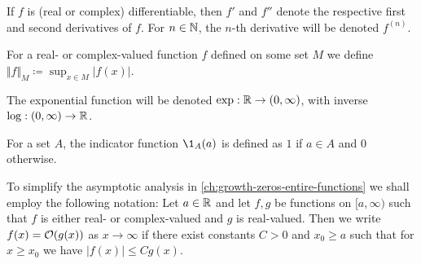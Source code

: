 If $f$ is (real or complex) differentiable, then $f'$ and $f''$ denote the respective first and second derivatives of $f$. For $n \in \mathbb{N}$, the $n$-th derivative will be denoted $f^{(n)}$.

For a real- or complex-valued function $f$ defined on some set $M$ we define $\Vert f \Vert_M \coloneqq \sup_{x \in M} \vert f(x) \vert$.

The exponential function will be denoted $\exp : \mathbb{R} \to (0, \infty)$, with inverse $\log : (0, \infty) \to \mathbb{R}$.

For a set $A$, the indicator function $\1_A(a)$ is defined as $1$ if $a \in A$ and $0$ otherwise.

To simplify the asymptotic analysis in \cref{ch:growth-zeros-entire-functions} we shall employ the following notation: Let $a \in \mathbb{R}$ and let $f, g$ be functions on $[a, \infty)$ such that $f$ is either real- or complex-valued and $g$ is real-valued. Then we write $f(x) = \mathcal{O}(g(x))$ as $x \to \infty$ if there exist constants $C > 0$ and $x_0 \geq a$ such that for $x \geq x_0$ we have $\vert f(x) \vert \leq C g(x)$.

